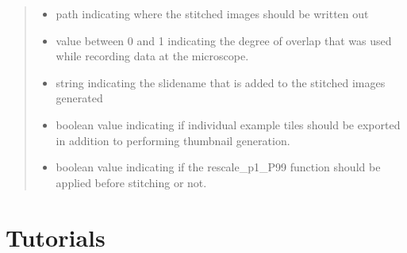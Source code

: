 \documentclass[a4paper,10pt,english,openany,oneside]{sphinxmanual}
\begin{document}
\begin{fulllineitems}
\begin{quote}
\begin{description}
\begin{itemize}
\item {} 
\sphinxAtStartPar
{} \textendash{} path indicating where the stitched images should be written out

\item {} 
\sphinxAtStartPar
{} \textendash{} value between 0 and 1 indicating the degree of overlap that was used while recording data at the microscope.

\item {} 
\sphinxAtStartPar
{} \textendash{} string indicating the slidename that is added to the stitched images generated

\item {} 
\sphinxAtStartPar
{} \textendash{} boolean value indicating if individual example tiles should be exported in addition to performing thumbnail generation.

\item {} 
\sphinxAtStartPar
{} \textendash{} boolean value indicating if the rescale\_p1\_P99 function should be applied before stitching or not.

\end{itemize}

\end{description}\end{quote}

\end{fulllineitems}



\chapter{Tutorials}
\label{\detokenize{pages/tutorials:tutorials}}\label{\detokenize{pages/tutorials::doc}}
\end{document}
